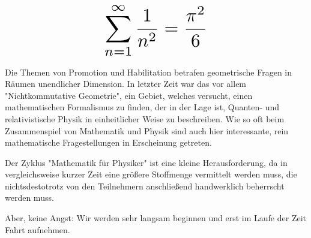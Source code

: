 \begin{multicols}{2}
\[
	\resizebox{0.4\columnwidth}{!}{
		$\displaystyle\sum_{n = 1}^\infty \frac{1}{n^2} = \frac{\pi^2}{6}$
	}
\]

Die Themen von Promotion und Habilitation betrafen geometrische Fragen in Räumen unendlicher Dimension.
In letzter Zeit war das vor allem "Nichtkommutative Geometrie", ein Gebiet, welches versucht, einen mathematischen Formalismus zu finden, der in der Lage ist, Quanten- und relativistische Physik in einheitlicher Weise zu beschreiben.
Wie so oft beim Zusammenspiel von Mathematik und Physik sind auch hier interessante, rein mathematische Fragestellungen in Erscheinung getreten.


Der Zyklus "Mathematik für Physiker" ist eine kleine Herausforderung, da in vergleichsweise kurzer Zeit eine größere Stoffmenge vermittelt werden muss, die nichtsdestotrotz von den Teilnehmern anschließend handwerklich beherrscht werden muss.

Aber, keine Angst: Wir werden sehr langsam beginnen und erst im Laufe der Zeit Fahrt aufnehmen.
\end{multicols}

\begin{center}
\end{center}
